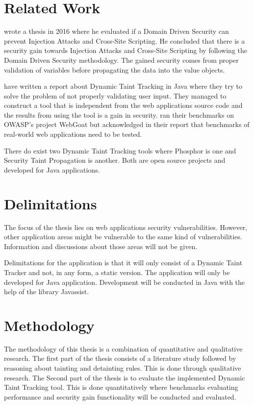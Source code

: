 \section{Related Work}
\label{RelatedWork}
\textcite{Stendahl2016} wrote a thesis in 2016 where he evaluated if a Domain Driven Security can prevent Injection Attacks and Cross-Site Scripting. He concluded that there is a security gain towards Injection Attacks and Cross-Site Scripting by following the Domain Driven Security methodology. The gained security comes from proper validation of variables before propagating the data into the value objects.

\textcite{Haldar} have written a report about Dynamic Taint Tracking in Java where they try to solve the problem of not properly validating user input. They managed to construct a tool that is independent from the web applications source code and the results from using the tool is a gain in security. \textcite{Haldar} ran their benchmarks on OWASP’s project WebGoat \parencite{webgoat} but acknowledged in their report that benchmarks of real-world web applications need to be tested.

There do exist two Dynamic Taint Tracking tools where Phosphor \parencite{phosphor} is one and Security Taint Propagation \parencite{securityTaint} is another. Both are open source projects and developed for Java applications.


\section{Delimitations}
\label{Delimitations}
The focus of the thesis lies on web applications security vulnerabilities. However, other application areas might be vulnerable to the same kind of vulnerabilities. Information and discussions about those areas will not be given.

Delimitations for the application is that it will only consist of a Dynamic Taint Tracker and not, in any form, a static version. The application will only be developed for Java application. Development will be conducted in Java with the help of the library Javassist.


\section{Methodology}
\label{Methodology}
The methodology of this thesis is a combination of quantitative and qualitative research. The first part of the thesis consists of a literature study followed by reasoning about tainting and detainting rules. This is done through qualitative research. The Second part of the thesis is to evaluate the implemented Dynamic Taint Tracking tool. This is done quantitatively where benchmarks evaluating performance and security gain functionality will be conducted and evaluated.

